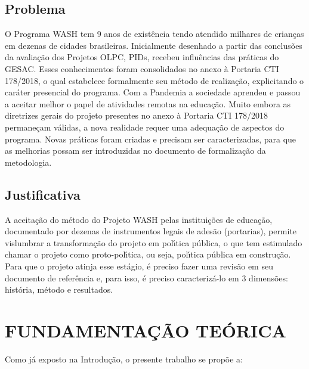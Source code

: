 \documentclass[
12pt,		%
openright,	%
twoside,  %
a4paper,			%
chapter=TITLE,		%
english,			%
french,				%
spanish,			%
brazil				%
]{USPSC-classe/USPSC_RedarTex}
\begin{document}
\section[Problema]{Problema}\label{Problema}
O Programa WASH tem 9 anos de exist\^encia tendo atendido milhares de crian\c{c}as em dezenas de cidades brasileiras. Inicialmente desenhado a partir das conclus\~oes da avalia\c{c}\~ao dos Projetos OLPC, PIDs, recebeu influ\^encias das pr\'aticas do GESAC. Esses conhecimentos foram consolidados no anexo \`a Portaria CTI 178/2018, o qual estabelece formalmente seu m\'etodo de realiza\c{c}\~ao, explicitando o car\'ater presencial do programa. Com a Pandemia a sociedade aprendeu e passou a aceitar melhor o papel de atividades remotas na educa\c{c}\~ao. Muito embora as diretrizes gerais do projeto presentes no anexo \`a Portaria CTI 178/2018 permane\c{c}am v\'alidas, a nova realidade requer uma adequa\c{c}\~ao de aspectos do programa. Novas pr\'aticas foram criadas e precisam ser caracterizadas, para que as melhorias possam ser introduzidas no documento de formaliza\c{c}\~ao da metodologia.








\section[Justificativa]{Justificativa}\label{Justificativa}
A aceita\c{c}\~ao do m\'etodo do Projeto WASH pelas institui\c{c}\~oes de educa\c{c}\~ao, documentado por dezenas de instrumentos legais de ades\~ao (portarias), permite vislumbrar a transforma\c{c}\~ao do projeto em pol\'{\i}tica p\'ublica, o que tem estimulado chamar o projeto como \textquotedbl proto-pol\'{\i}tica, ou seja, pol\'{\i}tica p\'ublica em constru\c{c}\~ao. Para que o projeto atinja esse est\'agio, \'e preciso fazer uma revis\~ao em seu documento de refer\^encia e, para isso, \'e preciso caracteriz\'a-lo em 3 dimens\~oes: hist\'oria, m\'etodo e resultados.








\chapter[FUNDAMENTA\c{C}\~AO TE\'ORICA ]{FUNDAMENTA\c{C}\~AO TE\'ORICA }\label{FUNDAMENTA\c{C}\~AO TE\'ORICA }
Como j\'a exposto na \textquotedbl Introdu\c{c}\~ao\textquotedbl , o presente trabalho se prop\~oe a:
\end{document}
